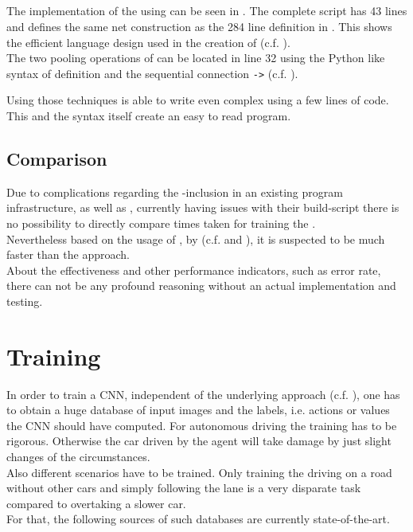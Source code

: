 \subsection{\cnnarch} \label{subsec: CNNArch Implementation}

The implementation of the \alexnet using \cnnarch can be seen in . The complete script has 43 lines and defines the same net construction as the 284 line definition in \caffe. This shows the efficient language design used in the creation of \cnnarch (c.f. ). \\
The two pooling operations of  can be located in line 32 using the Python like syntax of definition and the sequential connection \texttt{->} (c.f. ).

Using those techniques \cnnarch is able to write even complex \nn using a few lines of code. This and the syntax itself create an easy to read program.

\subsection{Comparison}
Due to complications regarding the \cnnarch-inclusion in an existing program infrastructure, as well as \caffe, currently having issues with their build-script there is no possibility to directly compare times taken for training the \nn. \\
Nevertheless based on the usage of \mxnet, by \cnnarch (c.f.  and ), it is suspected to be much faster than the \caffe approach.\\
About the effectiveness and other performance indicators, such as error rate, there can not be any profound reasoning without an actual implementation and testing.

\section{Training}

In order to train a CNN, independent of the underlying approach (c.f. ), one has to obtain a huge database of input images and the labels, i.e. actions or values the CNN should have computed. For autonomous driving the training has to be rigorous. Otherwise the car driven by the agent will take damage by just slight changes of the circumstances.\\
Also different scenarios have to be trained. Only training the driving on a road without other cars and simply following the lane is a very disparate task compared to overtaking a slower car.\\
For that, the following sources of such databases are currently state-of-the-art.

